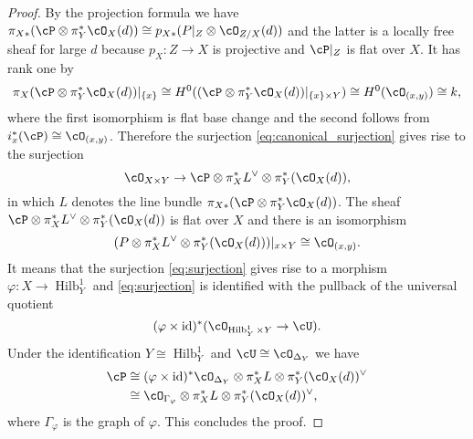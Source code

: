 \documentclass[12pt]{amsart}
\numberwithin{equation}{section}
\theoremstyle{plain}
\theoremstyle{definition}
\DeclareMathOperator{\id}{\mathrm{id}}
\DeclareMathOperator{\Hilb}{\mathrm{Hilb}}
\begin{document}
\begin{proof}
    By the projection formula we have $\pi_{X*}(\cP \otimes \pi_Y^* \cO_X(d)) \cong p_{X*}(P\vert_Z \otimes \cO_{Z/X}(d))$ and the latter is a locally free sheaf for large $d$
    because $p_X \colon Z \to X$ is projective and $\cP\vert_Z$ is flat over $X$.
    It has rank one by
    \begin{equation}
        \pi_{X}(\cP \otimes \pi_Y^* \cO_X(d))\vert_{\{x\}} \cong H^0((\cP \otimes \pi_Y^* \cO_X(d))\vert_{\{x\} \times Y}) \cong H^0(\cO_{(x, y)}) \cong k,
    \end{equation}
    where the first isomorphism is flat base change and the second follows from $i_x^*(\cP) \cong \cO_{(x, y)}$.
    Therefore the surjection \eqref{eq:canonical_surjection} gives rise to the surjection
    \begin{equation}\label{eq:surjection}
        \cO_{X \times Y} \to \cP \otimes \pi_X^*L^\vee \otimes \pi_Y^*(\cO_X(d)),
    \end{equation}
    in which $L$ denotes the line bundle $\pi_{X*}(\cP \otimes \pi_Y^* \cO_X(d))$.
    The sheaf $\cP \otimes \pi_X^*L^\vee \otimes \pi_Y^*(\cO_X(d))$ is flat over $X$ and there is an isomorphism
    \begin{equation}
        (P \otimes \pi_X^*L^\vee \otimes \pi_Y^*(\cO_X(d)))\vert_{x \times Y} \cong \cO_{(x, y)}.
    \end{equation}
    It means that the surjection \eqref{eq:surjection} gives rise to a morphism $\varphi \colon X \to \Hilb_{Y}^1$ and \eqref{eq:surjection} is identified with the pullback of the universal quotient
    \begin{equation}
        (\varphi \times \id)^*(\cO_{\Hilb_{Y}^1 \times Y} \to \cU).
    \end{equation}
    Under the identification $Y \cong \Hilb_{Y}^1$ and $\cU \cong \cO_{\Delta_{Y}}$ we have
    \begin{align}
        \cP & \cong (\varphi \times \id)^*\cO_{\Delta_{Y}} \otimes \pi_X^*L \otimes \pi_Y^*(\cO_X(d))^\vee \\
            & \cong \cO_{\Gamma_\varphi} \otimes \pi_X^*L \otimes \pi_Y^*(\cO_X(d))^\vee,
    \end{align}
    where $\Gamma_\varphi$ is the graph of $\varphi$.
    This concludes the proof.
\end{proof}
\end{document}
